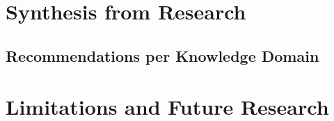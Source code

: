 \documentclass[conference]{IEEEtran}
\begin{document}
\section{Synthesis from Research}
\subsection{Recommendations per Knowledge Domain}


\section{Limitations and Future Research}

\printbibliography
\end{document}

